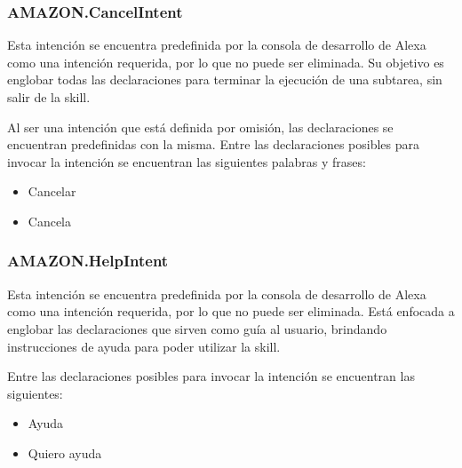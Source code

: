 
\subsubsection{AMAZON.CancelIntent}
\label{CancelIntentcapIV}

Esta intención se encuentra predefinida por la consola de desarrollo de Alexa como una intención requerida, por lo que no puede ser eliminada. Su objetivo es englobar todas las declaraciones para terminar la ejecución de una subtarea, sin salir de la skill.

Al ser una intención que está definida por omisión, las declaraciones se encuentran predefinidas con la misma. Entre las declaraciones posibles para invocar la intención se encuentran las siguientes palabras y frases:

\begin{itemize}
  \item Cancelar
  \item Cancela
\end{itemize}


\subsubsection{AMAZON.HelpIntent}
\label{HelpIntentcapIV}

Esta intención se encuentra predefinida por la consola de desarrollo de Alexa como una intención requerida, por lo que no puede ser eliminada. Está enfocada a englobar las declaraciones que sirven como guía al usuario, brindando instrucciones de ayuda para poder utilizar la skill.

Entre las declaraciones posibles para invocar la intención se encuentran las siguientes:

\begin{itemize}
  \item Ayuda
  \item Quiero ayuda
\end{itemize}


